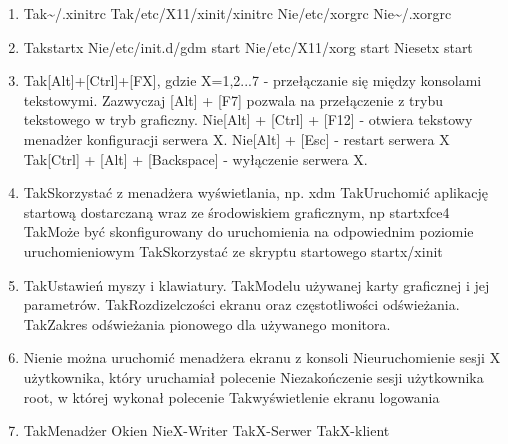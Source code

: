 \begin{enumerate}
	\item {}
	{Tak}{\textasciitilde/.xinitrc}
	{Tak}{/etc/X11/xinit/xinitrc}
	{Nie}{/etc/xorgrc}
	{Nie}{\textasciitilde/.xorgrc}
	
	\item {}
	{Tak}{startx}
	{Nie}{/etc/init.d/gdm start}
	{Nie}{/etc/X11/xorg start}
	{Nie}{setx start}
	
	\item {}
	{Tak}{[Alt]+[Ctrl]+[FX], gdzie X={1,2...7} - przełączanie się między konsolami tekstowymi. Zazwyczaj [Alt] + [F7] pozwala na przełączenie z trybu tekstowego  w tryb graficzny.}
	{Nie}{[Alt] + [Ctrl] + [F12] - otwiera tekstowy menadżer konfiguracji serwera X.}
	{Nie}{[Alt] + [Esc] - restart serwera X}
	{Tak}{[Ctrl] + [Alt] + [Backspace] - wyłączenie serwera X.}
	
	\item {}
	{Tak}{Skorzystać z menadżera wyświetlania, np. xdm}
	{Tak}{Uruchomić aplikację startową dostarczaną wraz ze środowiskiem graficznym, np startxfce4}
	{Tak}{Może być skonfigurowany do uruchomienia na odpowiednim poziomie uruchomieniowym}
	{Tak}{Skorzystać ze skryptu startowego startx/xinit}

	\item {}
	{Tak}{Ustawień myszy i klawiatury.}
	{Tak}{Modelu używanej karty graficznej i jej parametrów.}
	{Tak}{Rozdizelczości ekranu oraz częstotliwości odświeżania.}
	{Tak}{Zakres odświeżania pionowego dla używanego monitora.}
	
	\newpage
	
	\item {}
	{Nie}{nie można uruchomić menadżera ekranu z konsoli}
	{Nie}{uruchomienie sesji X użytkownika, który uruchamiał polecenie}
	{Nie}{zakończenie sesji użytkownika root, w której wykonał polecenie}
	{Tak}{wyświetlenie ekranu logowania}
	
	\item {}
	{Tak}{Menadżer Okien}
	{Nie}{X-Writer}
	{Tak}{X-Serwer}
	{Tak}{X-klient}
	

\end{enumerate}
